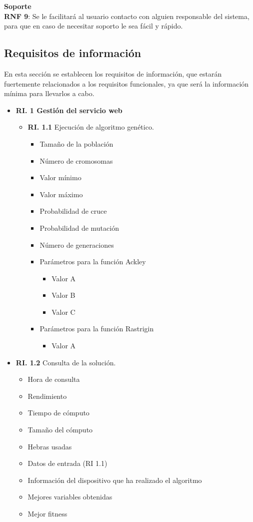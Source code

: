 \textbf{Soporte}\\

\textbf{RNF 9}: Se le facilitará al usuario contacto con alguien responsable del sistema, para que en caso de necesitar soporto le sea fácil y rápido.\\


\bigskip
\subsection{Requisitos de información}

\bigskip
En esta sección se establecen los requisitos de información, que estarán fuertemente relacionados a los requisitos funcionales, ya que será la información mínima para llevarlos a cabo.

\begin{itemize}
	\item  \textbf{RI. 1 Gestión del servicio web}
	\begin{itemize}
		\item \textbf{RI. 1.1} Ejecución de algoritmo genético.
		\begin{itemize}
			\item Tamaño de la población
			\item Número de cromosomas
			\item Valor mínimo
			\item Valor máximo
			\item Probabilidad de cruce
			\item Probabilidad de mutación
			\item Número de generaciones
			\item Parámetros para la función Ackley
				\begin{itemize}
					\item Valor A
					\item Valor B
					\item Valor C 		
				\end{itemize}			
			\item Parámetros para la función Rastrigin
			\begin{itemize}
				\item Valor A
			\end{itemize}
		\end{itemize}
	\end{itemize}
		
	\item \textbf{RI. 1.2} Consulta de la solución.
	\begin{itemize}
		\item Hora de consulta
		\item Rendimiento
		\item Tiempo de cómputo
		\item Tamaño del cómputo
		\item Hebras usadas
		\item Datos de entrada (RI 1.1)
		\item Información del dispositivo que ha realizado el algoritmo
		\item Mejores variables obtenidas
		\item Mejor fitness
	\end{itemize}



\end{itemize}
